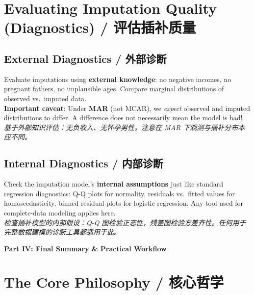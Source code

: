 \documentclass[9pt, a4paper]{article}
\begin{document}
\section{Evaluating Imputation Quality (Diagnostics) / 评估插补质量}

\subsection{External Diagnostics / 外部诊断}
\begin{tcolorbox}[defbox]
    Evaluate imputations using \textbf{external knowledge}: no negative incomes, no pregnant fathers, no implausible ages. Compare marginal distributions of observed vs.\ imputed data.\\
    \textbf{Important caveat}: Under \textbf{MAR} (not MCAR), we \textit{expect} observed and imputed distributions to differ. A difference does not necessarily mean the model is bad!\\
    \textit{基于外部知识评估：无负收入、无怀孕男性。注意在 MAR 下观测与插补分布本应不同。}
\end{tcolorbox}

\subsection{Internal Diagnostics / 内部诊断}
\begin{tcolorbox}[defbox]
    Check the imputation model's \textbf{internal assumptions} just like standard regression diagnostics: Q-Q plots for normality, residuals vs.\ fitted values for homoscedasticity, binned residual plots for logistic regression. Any tool used for complete-data modeling applies here.\\
    \textit{检查插补模型的内部假设：Q-Q 图检验正态性，残差图检验方差齐性。任何用于完整数据建模的诊断工具都适用于此。}
\end{tcolorbox}

\begin{center}
    \Large \textbf{Part IV: Final Summary \& Practical Workflow}
\end{center}

\section{The Core Philosophy / 核心哲学}
\end{document}
